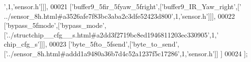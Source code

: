\begin{DoxyCode}
{      '},1,\textcolor{stringliteral}{'sensor.h'}]]],
00021   [\textcolor{stringliteral}{'buffer9\_5fir\_5fyaw\_5fright'},[\textcolor{stringliteral}{'buffer9\_IR\_Yaw\_right'},[\textcolor{stringliteral}{'
      ../sensor\_8h.html#a3526afe7f83bc3aba2c3dfe52423d800'},1,\textcolor{stringliteral}{'sensor.h'}]]],
00022   [\textcolor{stringliteral}{'bypass\_5fmode'},[\textcolor{stringliteral}{'bypass\_mode'},[\textcolor{stringliteral}{'../structchip\_\_cfg\_\_s.html#a2dd3f2719bc8ed1946811203ec330905'},1,\textcolor{stringliteral}{'
      chip\_cfg\_s'}]]],
00023   [\textcolor{stringliteral}{'byte\_5fto\_5fsend'},[\textcolor{stringliteral}{'byte\_to\_send'},[\textcolor{stringliteral}{'../sensor\_8h.html#addd1a9480a36b7d4c52a1237f5c17286'},1,\textcolor{stringliteral}{'sensor.h'}]]
      ]
00024 ];
\end{DoxyCode}

